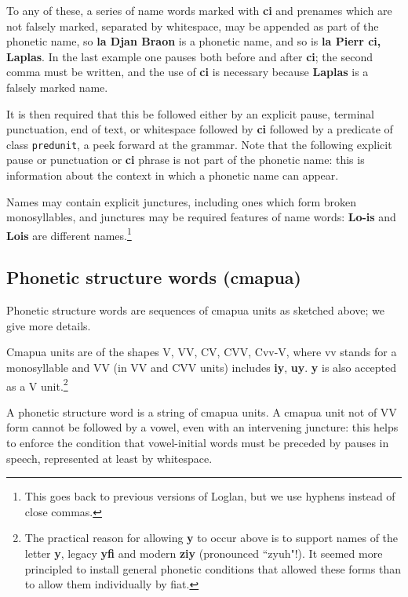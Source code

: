 \documentclass[12pt]{book}
\begin{document}
To any of these, a series of name words marked with {\bf ci} and prenames which are not falsely marked, separated by whitespace, may be appended as part of the phonetic name,
so {\bf la Djan Braon} is a phonetic name, and so is {\bf la Pierr ci, Laplas}.  In the last example one pauses both before and after {\bf ci};  the second comma must be written, and the use of {\bf ci} is necessary because {\bf Laplas} is a falsely marked name.

It is then required that this be followed either by an explicit pause, terminal punctuation, end of text, or whitespace followed by {\bf ci} followed by a predicate of class {\tt predunit}, a peek forward at the grammar.  Note that the following explicit pause or punctuation or {\bf ci} phrase is not part of the phonetic name:  this is information about the context in which a phonetic name can appear.

Names may contain explicit junctures, including ones which form broken monosyllables, and junctures may be required features of name words:  {\bf Lo-is} and {\bf Lois} are different names.\footnote{This goes back to previous versions of Loglan, but we use hyphens instead of close commas.}

\subsection{Phonetic structure words (cmapua)}

Phonetic structure words are sequences of cmapua units as sketched above;  we give more details.

Cmapua units are of the shapes V, VV, CV, CVV, Cvv-V, where vv stands for a monosyllable and VV (in VV and CVV units) includes {\bf iy}, {\bf uy}.  {\bf y} is also accepted as a V unit.\footnote{The practical reason for allowing {\bf y} to occur above is to support names of the letter {\bf y}, legacy {\bf yfi} and modern {\bf ziy} (pronounced ``zyuh"!).  It seemed more principled to install general phonetic conditions that allowed these forms than to allow them individually by fiat.}

A phonetic structure word is a string of cmapua units.  A cmapua unit not of VV form cannot be followed by a vowel, even with an intervening juncture:  this helps to enforce
the condition that vowel-initial words must be preceded by pauses in speech, represented at least by whitespace. 
\end{document}

